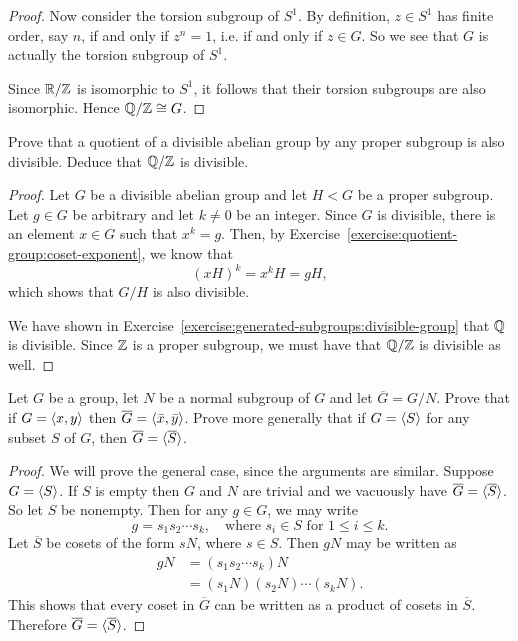 \begin{enumerate}
\begin{proof}
    Now consider the torsion subgroup of $S^1$. By definition, $z\in S^1$
    has finite order, say $n$, if and only if $z^n = 1$, i.e. if and
    only if $z\in G$. So we see that $G$ is actually the torsion
    subgroup of $S^1$.

    Since $\mathbb{R}/\mathbb{Z}$ is isomorphic to $S^1$, it follows that their
    torsion subgroups are also isomorphic. Hence $\mathbb{Q}/\mathbb{Z}\cong G$.
  \end{proof}
\end{enumerate}

\label{exercise:quotient-group:divisible-quotient}
Prove that a quotient of a divisible abelian group by any proper
subgroup is also divisible. Deduce that $\mathbb{Q}/\mathbb{Z}$ is divisible.
\begin{proof}
  Let $G$ be a divisible abelian group and let $H<G$ be a proper
  subgroup. Let $g\in G$ be arbitrary and let $k\neq0$ be an
  integer. Since $G$ is divisible, there is an element $x\in G$ such
  that $x^k = g$. Then, by
  Exercise~\ref{exercise:quotient-group:coset-exponent}, we know that
  \begin{equation*}
    (xH)^k = x^kH = gH,
  \end{equation*}
  which shows that $G/H$ is also divisible.

  We have shown in
  Exercise~\ref{exercise:generated-subgroups:divisible-group} that
  $\mathbb{Q}$ is divisible. Since $\mathbb{Z}$ is a proper subgroup, we must have
  that $\mathbb{Q}/\mathbb{Z}$ is divisible as well.
\end{proof}

\label{exercise:quotient-group:generators}
Let $G$ be a group, let $N$ be a normal subgroup of $G$ and let
$\overline{G} = G/N$. Prove that if $G = \langle{x,y}\rangle$ then
$\overline{G} = \langle{\bar x,\bar y}\rangle$. Prove more generally that if
$G = \langle{S}\rangle$ for any subset $S$ of $G$, then
$\overline{G} = \langle{\overline{S}}\rangle$.
\begin{proof}
  We will prove the general case, since the arguments are
  similar. Suppose $G = \langle{S}\rangle$. If $S$ is empty then $G$ and $N$ are
  trivial and we vacuously have $\overline{G} =
  \langle{\overline{S}}\rangle$. So let $S$ be nonempty. Then for any $g\in G$,
  we may write
  \begin{equation*}
    g = s_1s_2\cdots s_k,
    \quad\text{where $s_i\in S$ for $1\leq i\leq k$}.
  \end{equation*}
  Let $\overline{S}$ be cosets of the form $sN$, where $s\in S$. Then
  $gN$ may be written as
  \begin{align*}
    gN &= (s_1s_2\cdots s_k)N \\
       &= (s_1N)(s_2N)\cdots(s_kN).
  \end{align*}
  This shows that every coset in $\overline{G}$ can be written as a
  product of cosets in $\overline{S}$. Therefore
  $\overline{G} = \langle{\overline{S}}\rangle$.
\end{proof}

